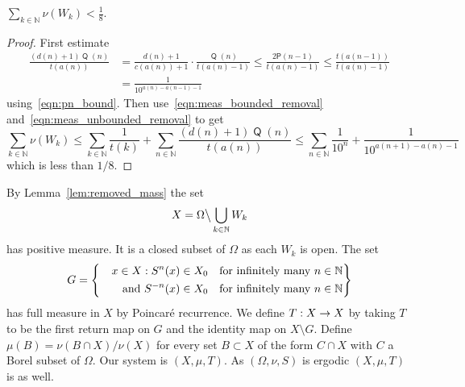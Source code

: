 \documentclass[AHL,Unicode,longabstracts,published]{cedram}
\DeclareMathOperator{\Q}{\mathsf{Q}}
\newcommand{\N}{\mathbb{N}}
\renewcommand{\P}{\mathsf{P}}
\let\originalleft\left
\let\originalright\right
\renewcommand{\left}{\mathopen{}\mathclose\bgroup\originalleft}
\renewcommand{\right}{\aftergroup\egroup\originalright}
\renewcommand*{\to}{\mathchoice{\longrightarrow}{\rightarrow}{\rightarrow}{\rightarrow}}
\begin{document}
\begin{lemm}\label{lem:removed_mass}
$
\sum_{k \in \N} \nu(W_k) < \frac{1}{8}.
$
\end{lemm}
\begin{proof}
First estimate
\begin{equation}\label{eq:unbounded removal est}
\begin{aligned}
\frac{(d(n)+1) \Q(n)}{t(a(n))} &=
\frac{d(n)+1}{c(a(n))+1} \cdot \frac{\Q(n)}{t(a(n)-1)}
\le
\frac{2\P(n-1)}{t(a(n)-1)}
\le
\frac{t(a(n-1))}{t(a(n)-1)}\\
&=
\frac{1}{10^{a(n) - a(n-1)-1}}
\end{aligned}
\end{equation}
using~\eqref{eqn:pn_bound}. Then use~\eqref{eqn:meas_bounded_removal} and~\eqref{eqn:meas_unbounded_removal} to get
\[
\sum_{k \in \N} \nu(W_k)
\le
\sum_{k \in \N} \frac{1}{t(k)} + \sum_{n \in \N} \frac{(d(n)+1) \Q(n)}{t(a(n))}
\le \sum_{n \in \N} \frac{1}{10^n} + \frac{1}{10^{a(n+1) - a(n)-1}}
\]
which is less than $1/8$.
\end{proof}


By Lemma~\ref{lem:removed_mass} the set
\[
X = \Omega \big\backslash \bigcup_{k \in \N} W_k
\]
has positive measure. It is a closed subset of $\Omega$ as each $W_k$ is open. The set
\[
G =
\left\{
\begin{aligned}
x \in X : S^n(x) \in X_0\quad &\text{for infinitely many } n \in \N\\
\qquad\text{and } S^{-n}(x) \in X_0\quad &\text{for infinitely many } n \in \N
\end{aligned}
\right\}
\]
has full measure in $X$ by Poincaré{} recurrence. We define $T : X \to X$ by taking $T$ to be the first return map on $G$ and the identity map on $X \setminus G$. Define $\mu(B) = \nu(B \cap X) / \nu(X)$ for every set $B \subset X$ of the form $C \cap X$ with $C$ a Borel subset of $\Omega$. Our system is $(X,\mu,T)$. As $(\Omega,\nu,S)$ is ergodic $(X,\mu,T)$ is as well.
\end{document}

